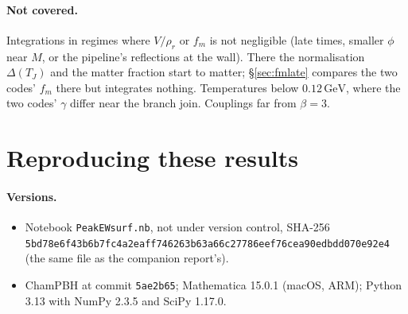 \documentclass[11pt,a4paper]{article}
\newcommand{\TJ}{T_{J}}
\newcommand{\GeV}{\,\mathrm{GeV}}
\newcommand{\code}[1]{\texttt{#1}}
\begin{document}
\paragraph{Not covered.} Integrations in regimes where $V/\rho_r$ or $f_m$ is not negligible
(late times, smaller $\phi$ near $M$, or the pipeline's reflections at the wall). There the
normalisation $\Delta(\TJ)$ and the matter fraction start to matter; \S\ref{sec:fmlate}
compares the two codes' $f_m$ there but integrates nothing. Temperatures below $0.12\GeV$, where
the two codes' $\gamma$ differ near the branch join. Couplings far from $\beta = 3$.

\appendix
\section{Reproducing these results}

\paragraph{Versions.}
\begin{itemize}
\item Notebook \code{PeakEWsurf.nb}, not under version control, SHA-256\\
  {\small\code{5bd78e6f43b6b7fc4a2eaff746263b63a66c27786eef76cea90edbdd070e92e4}} (the same file
  as the companion report's).
\item ChamPBH at commit \code{5ae2b65}; Mathematica 15.0.1 (macOS, ARM); Python 3.13 with NumPy
  2.3.5 and SciPy 1.17.0.
\end{itemize}
\end{document}
